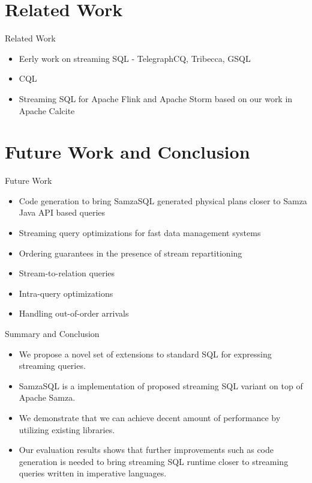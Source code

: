 \documentclass[newPxFont]{beamer}
\begin{document}
\section{Related Work}

\begin{frame}[c]{Related Work}
\begin{itemize}
	\item Eerly work on streaming SQL - TelegraphCQ, Tribecca, GSQL
	\item CQL
	\item Streaming SQL for Apache Flink and Apache Storm based on our work in Apache Calcite 
	\end{itemize}
\end{frame}



\section{Future Work and Conclusion}

\begin{frame}[c]{Future Work}
\begin{itemize}
	\item Code generation to bring SamzaSQL generated physical plans closer to Samza Java API based queries  
	\item Streaming query optimizations for fast data management systems
	\item Ordering guarantees in the presence of stream repartitioning 
	\item Stream-to-relation queries
	\item Intra-query optimizations
	\item Handling out-of-order arrivals
\end{itemize}
\end{frame}

\begin{frame}[c]{Summary and Conclusion}
\begin{itemize}
	\item We propose a novel set of extensions to standard SQL for expressing streaming queries.
	\item SamzaSQL is a implementation of proposed streaming SQL variant on top of Apache Samza.
	\item We demonstrate that we can achieve decent amount of performance by utilizing existing libraries.
	\item Our evaluation results shows that further improvements such as code generation is needed to bring streaming SQL runtime closer to streaming queries written in imperative languages.
\end{itemize}
\end{frame}
\end{document}
